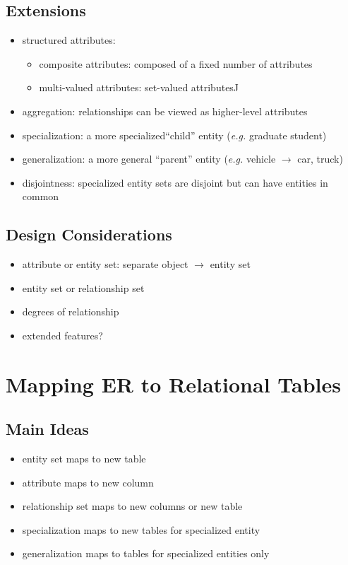 \documentclass[]{article}
\theoremstyle{definition}
\begin{document}
	\subsection{Extensions}
	\begin{itemize}
		\item structured attributes:
			\begin{itemize}
				\item composite attributes: composed of a fixed number of attributes
				\item multi-valued attributes: set-valued attributesJ
			\end{itemize}
		\item aggregation: relationships can be viewed as higher-level attributes
		\item specialization: a more specialized``child'' entity (\textit{e.g.} graduate student)
		\item generalization: a more general ``parent'' entity (\textit{e.g.} vehicle $\rightarrow$ car, truck)
		\item disjointness: specialized entity sets are disjoint but can have entities in common
	\end{itemize}

	\subsection{Design Considerations}
	\begin{itemize}
		\item attribute or entity set: separate object $\rightarrow$ entity set
		\item entity set or relationship set
		\item degrees of relationship
		\item extended features?
	\end{itemize}

	\section{Mapping ER to Relational Tables}
	\subsection{Main Ideas}
	\begin{itemize}
		\item entity set maps to new table
		\item attribute maps to new column
		\item relationship set maps to new columns or new table
		\item specialization maps to new tables for specialized entity
		\item generalization maps to tables for specialized entities only
	\end{itemize}
\end{document}
